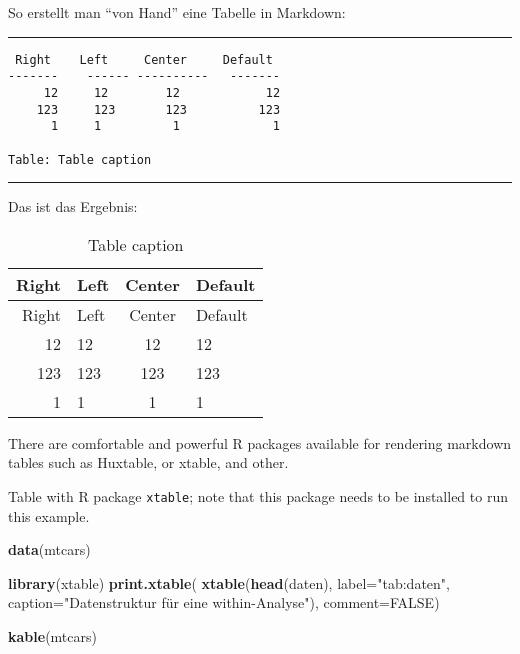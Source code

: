 \documentclass[11pt,english,a4paper,oneside]{article}
\newenvironment{Shaded}{\begin{snugshade}}{\end{snugshade}}
\newcommand{\DataTypeTok}[1]{\textcolor[rgb]{0.13,0.29,0.53}{#1}}
\newcommand{\KeywordTok}[1]{\textcolor[rgb]{0.13,0.29,0.53}{\textbf{#1}}}
\newcommand{\NormalTok}[1]{#1}
\newcommand{\OtherTok}[1]{\textcolor[rgb]{0.56,0.35,0.01}{#1}}
\newcommand{\StringTok}[1]{\textcolor[rgb]{0.31,0.60,0.02}{#1}}
\begin{document}
So erstellt man \enquote{von Hand} eine Tabelle in Markdown:

\begin{center}\rule{0.5\linewidth}{\linethickness}\end{center}

\begin{verbatim}
 Right    Left     Center     Default
-------    ------ ----------   -------
     12     12        12            12
    123     123       123          123
      1     1          1             1
      
Table: Table caption
\end{verbatim}

\begin{center}\rule{0.5\linewidth}{\linethickness}\end{center}

Das ist das Ergebnis:

\begin{longtable}[]{@{}rlcl@{}}
\caption{Table caption}\tabularnewline
\toprule
Right & Left & Center & Default\tabularnewline
\midrule
\endfirsthead
\toprule
Right & Left & Center & Default\tabularnewline
\midrule
\endhead
12 & 12 & 12 & 12\tabularnewline
123 & 123 & 123 & 123\tabularnewline
1 & 1 & 1 & 1\tabularnewline
\bottomrule
\end{longtable}

There are comfortable and powerful R packages available for rendering
markdown tables such as Huxtable, or xtable, and other.

Table with R package \texttt{xtable}; note that this package needs to be
installed to run this example.

\begin{Shaded}
\begin{Highlighting}[]
\KeywordTok{data}\NormalTok{(mtcars)}

\KeywordTok{library}\NormalTok{(xtable)}
\KeywordTok{print.xtable}\NormalTok{(}
  \KeywordTok{xtable}\NormalTok{(}\KeywordTok{head}\NormalTok{(daten), }
         \DataTypeTok{label=}\StringTok{"tab:daten"}\NormalTok{, }
         \DataTypeTok{caption=}\StringTok{"Datenstruktur für eine within-Analyse"}\NormalTok{), }
  \DataTypeTok{comment=}\OtherTok{FALSE}\NormalTok{)}
\end{Highlighting}
\end{Shaded}

\begin{Shaded}
\begin{Highlighting}[]
\KeywordTok{kable}\NormalTok{(mtcars)}
\end{Highlighting}
\end{Shaded}
\end{document}
